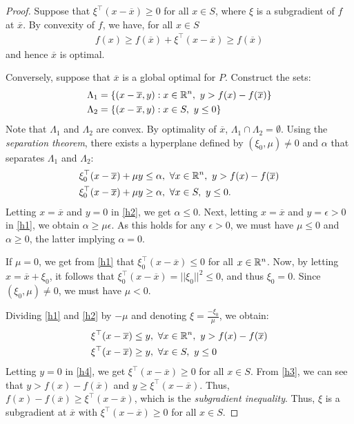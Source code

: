 \begin{proof}
Suppose that $\xi^\top(x-\overline{x}) \geq 0$ for all $x \in S$, where $\xi$ is a subgradient of $f$ at $\overline{x}$. By convexity of $f$, we have, for all $x \in S$
%
\begin{align*}
f(x) \geq f(\overline{x}) + \xi^\top(x - \overline{x}) \geq f(\overline{x})
\end{align*}
%
and hence $\overline{x}$ is optimal.

Conversely, suppose that $\overline{x}$ is a global optimal for $P$. Construct the sets:
%
\begin{align*}
&\Lambda_1 = \left\{ (x - \overline{x},y) : x \in \mathbb{R}^n, \ y > f(x) - f(\overline{x}) \right \} \\
&\Lambda_2 = \left\{ (x - \overline{x},y) : x \in S, \ y \leq 0 \right \}
\end{align*}
%
Note that $\Lambda_1$ and $\Lambda_2$ are convex. By optimality of $\overline{x}$, $\Lambda_1 \cap \Lambda_2 = \emptyset$. Using the \emph{separation theorem}, there exists a hyperplane defined by $(\xi_0, \mu) \neq 0$ and $\alpha$ that separates $\Lambda_1$ and $\Lambda_2$:
%
\begin{align}
&\xi_0^\top(x - \overline{x}) + \mu y \leq \alpha, \ \forall x \in \mathbb{R}^n, \ y > f(x) - f(\overline{x}) \label{h1}\\  
&\xi_0^\top(x - \overline{x}) + \mu y \geq \alpha, \ \forall x \in S, \ y \leq 0. \label{h2}
\end{align}
%
Letting $x = \overline{x}$ and $y=0$ in \eqref{h2}, we get $\alpha \leq 0$. Next, letting $x = \overline{x}$ and $y=\epsilon > 0$ in \eqref{h1}, we obtain $\alpha \geq \mu\epsilon$. As this holds for any $\epsilon > 0$, we must have $\mu \leq 0$ and $\alpha \geq 0$, the latter implying $\alpha = 0$.

If $\mu = 0$, we get from \eqref{h1} that $\xi_0^\top(x - \overline{x}) \leq 0$ for all $x\in \mathbb{R}^n$. Now, by letting $x = \overline{x} + \xi_0$, it follows that $\xi_0^\top(x - \overline{x})  = ||\xi_0||^2 \leq 0$, and thus $\xi_0=0$. Since $(\xi_0, \mu) \neq 0$, we must have $\mu < 0$. 

Dividing \eqref{h1} and \eqref{h2} by $-\mu$ and denoting $\xi = \frac{-\xi_0}{\mu}$, we obtain:
%
\begin{align}
&\xi^\top(x - \overline{x}) \leq y, \ \forall x \in \mathbb{R}^n, \ y > f(x) - f(\overline{x}) \label{h3}\\  
&\xi^\top(x - \overline{x}) \geq y, \ \forall x \in S, \ y \leq 0 \label{h4}
\end{align}
%
Letting $y=0$ in \eqref{h4}, we get $\xi^\top(x - \overline{x}) \geq 0$ for all $x \in S$. From \eqref{h3}, we can see that $y > f(x) - f(\overline{x})$ and $y \geq \xi^\top(x - \overline{x})$.\hspace{-2pt} Thus, $f(x) - f(\overline{x}) \geq \xi^\top(x - \overline{x})$, which is the \emph{subgradient inequality}. Thus, $\xi$ is a subgradient at $\overline{x}$ with $\xi^\top(x - \overline{x}) \geq 0$ for all $x \in S$.
\end{proof}
